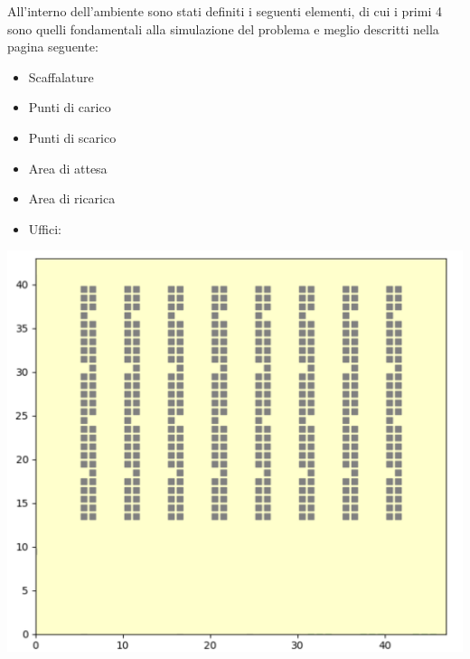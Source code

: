 \documentclass[12pt]{article}
\begin{document}
\noindent All'interno dell'ambiente sono stati definiti i seguenti elementi, di cui i primi 4 sono quelli fondamentali alla simulazione del problema e meglio descritti nella pagina seguente:

\begin{itemize}
\item Scaffalature
\item Punti di carico
\item Punti di scarico
\item Area di attesa
\item Area di ricarica
\item Uffici:
\end{itemize}
\newpage


\begin{minipage}[ht]{0.45\linewidth}
\centering
\includegraphics[width=\textwidth]{Figures/Map/Corsie.png}
\end{minipage}
\hspace{0.5cm}
\end{document}
